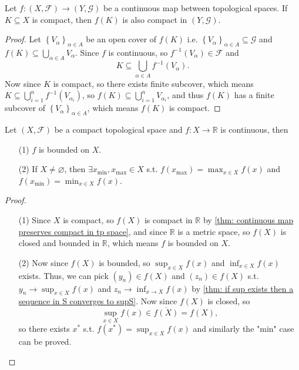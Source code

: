 \begin{theorem} \label{thm: continuous map preserves compact in tp space}
    Let \(f: \left( X, \mathcal{F}  \right) \to  (Y, \mathcal{G} ) \) be a continuous map between topological spaces. If \(K \subseteq X\) is compact, then \(f(K)\) is also compact in \((Y, \mathcal{G} )\).  
\end{theorem}
\begin{proof}
    Let \(\left\{ V_\alpha  \right\}_{\alpha \in A} \) be an open cover of \(f(K)\) i.e. \( \left\{ V_\alpha  \right\}_{\alpha \in A} \subseteq \mathcal{G}\) and \(f(K) \subseteq \bigcup_{\alpha \in A} V_{\alpha }\). Since \(f\) is continuous, so \(f^{-1} \left( V_\alpha  \right) \in \mathcal{F}  \) and 
    \[
        K \subseteq \bigcup_{\alpha \in A} f^{-1} \left( V_\alpha  \right). 
    \] Now since \(K\) is compact, so there exists finite subcover, which means \(K \subseteq \bigcup_{i=1}^{n} f^{-1} \left( V_{\alpha_i} \right)  \), so \(f(K) \subseteq \bigcup_{i=1}^{n} V_{\alpha _i} \), and thus \(f(K)\) has a finite subcover of \(\left\{ V_\alpha  \right\}_{\alpha \in A} \), which means \(f(K)\) is compact.     
\end{proof}

\begin{proposition}
    Let \((X, \mathcal{F} )\) be a compact topological space and \(f: X \to \mathbb{R} \) is continuous, then 
    \begin{itemize}
        \item [(1)] \(f\) is bounded on \(X\). 
        \item [(2)] If \(X \neq \varnothing \), then \(\exists x_{\text{min}}, x_{\text{max}} \in X\) s.t. \(f \left( x_{\text{max}} \right) = \max _{x \in X} f(x) \) and \(f \left( x_{\text{min}} \right) = \min _{x \in X} f(x) \).      
    \end{itemize} 
\end{proposition}
\begin{proof}
    \vphantom{text}
    \begin{itemize}
        \item [(1)] Since \(X\) is compact, so \(f(X)\) is compact in \(\mathbb{R} \) by \autoref{thm: continuous map preserves compact in tp space}, and since \(\mathbb{R} \) is a metric space, so \(f(X)\) is closed and bounded in \(\mathbb{R} \), which means \(f\) is bounded on \(X\).        
        \item [(2)] Now since \(f(X)\) is bounded, so \(\sup _{x \in X} f(x)\) and \(\inf _{x \in X} f(x)\) exists. Thus, we can pick \(\left( y_n \right) \in f(X) \) and \(\left( z_n \right) \in f(X) \) s.t. \(y_n \to \sup _{x \in X} f(x)\) and \(z_n \to \inf _{x \to X} f(x)\) by \autoref{thm: if sup exists then a sequence in S converges to supS}. Now since \(f(X)\) is closed, so  
        \[
            \sup _{x \in X} f(x) \in \overline{f(X)} = f(X),
        \] so there exists \(x^*\) s.t. \(f \left( x^* \right) = \sup _{x \in X} f(x) \) and similarly the "min" case can be proved.   
    \end{itemize}
\end{proof}

